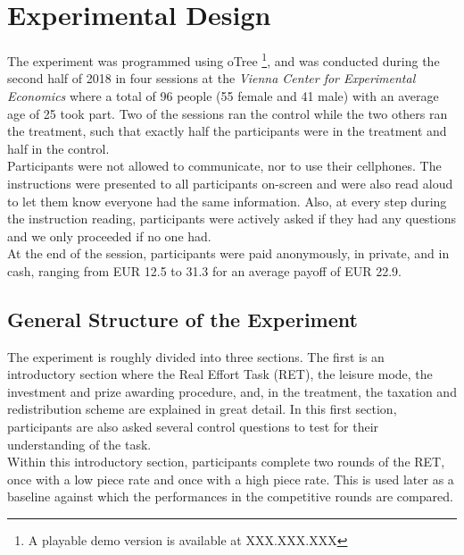     \chapter{Experimental Design}
    \label{ch:experiment}
    \thispagestyle{fancy}
    
    The experiment was programmed using oTree \citep{chen2016}\footnote{A playable demo version is available at XXX.XXX.XXX}, and was conducted during the second half of 2018 in four sessions at the \textit{Vienna Center for Experimental Economics} where a total of 96 people (55 female and 41 male) with an average age of 25 took part. Two of the sessions ran the control while the two others ran the treatment, such that exactly half the participants were in the treatment and half in the control.\\
    
    Participants were not allowed to communicate, nor to use their cellphones. The instructions were presented to all participants on-screen and were also read aloud to let them know everyone had the same information. Also, at every step during the instruction reading, participants were actively asked if they had any questions and we only proceeded if no one had.\\
    
    At the end of the session, participants were paid anonymously, in private, and in cash, ranging from EUR 12.5 to 31.3 for an average payoff of EUR 22.9.
    
    \section{General Structure of the Experiment}
    
    The experiment is roughly divided into three sections. The first is an introductory section where the Real Effort Task (RET), the leisure mode, the investment and prize awarding procedure, and, in the treatment, the taxation and redistribution scheme are explained in great detail. In this first section, participants are also asked several control questions to test for their understanding of the task.\\
    
    Within this introductory section, participants complete two rounds of the RET, once with a low piece rate and once with a high piece rate. This is used later as a baseline against which the performances in the competitive rounds are compared.\\
    

